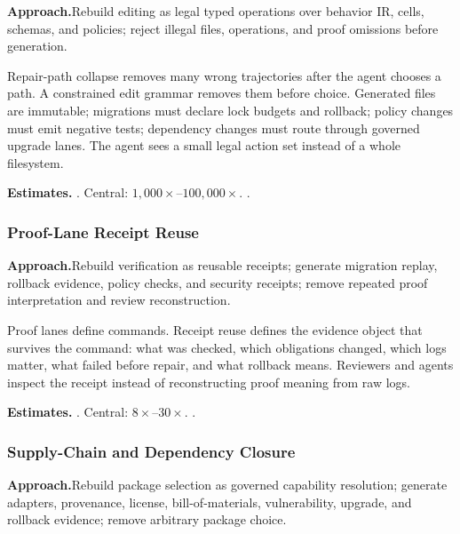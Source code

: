 \smallskip\noindent
\textbf{Approach.}\quad Rebuild editing as legal typed operations over behavior IR, cells, schemas, and policies; reject illegal files, operations, and proof omissions before generation.

Repair-path collapse removes many wrong trajectories after the agent
chooses a path.  A constrained edit grammar removes them before choice.
Generated files are immutable; migrations must declare lock budgets and
rollback; policy changes must emit negative tests; dependency changes
must route through governed upgrade lanes.  The agent sees a small legal
action set instead of a whole filesystem.

\smallskip\noindent
\textbf{Estimates.}\quad
{}.\quad
Central: $1{,}000\times$--$100{,}000\times$.\quad
{}.

\subsubsection{Proof-Lane Receipt Reuse}
\label{ssec:proof-receipts}

\smallskip\noindent
\textbf{Approach.}\quad Rebuild verification as reusable receipts; generate migration replay, rollback evidence, policy checks, and security receipts; remove repeated proof interpretation and review reconstruction.

Proof lanes define commands.  Receipt reuse defines the evidence object
that survives the command: what was checked, which obligations changed,
which logs matter, what failed before repair, and what rollback means.
Reviewers and agents inspect the receipt instead of reconstructing proof
meaning from raw logs.

\smallskip\noindent
\textbf{Estimates.}\quad
{}.\quad
Central: $8\times$--$30\times$.\quad
{}.

\subsubsection{Supply-Chain and Dependency Closure}
\label{ssec:supply-chain-closure}

\smallskip\noindent
\textbf{Approach.}\quad Rebuild package selection as governed capability resolution; generate adapters, provenance, license, bill-of-materials, vulnerability, upgrade, and rollback evidence; remove arbitrary package choice.

